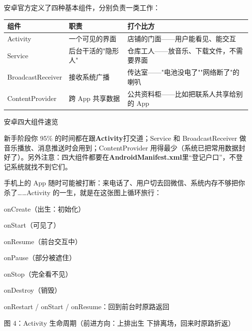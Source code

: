 


安卓官方定义了四种基本组件，分别负责一类工作：

\begin{center}
\begin{tabularx}{\linewidth}{|X|X|X|}
\hline
\textbf{组件} & \textbf{职责} & \textbf{打个比方} \tabularnewline
\hline
Activity & 一个可见的界面 & 店铺的门面——用户能看见、能交互 \tabularnewline
Service & 后台干活的"隐形人" & 仓库工人——放音乐、下载文件，不需要界面 \tabularnewline
BroadcastReceiver & 接收系统广播 & 传达室——"电池没电了""网络断了"的喇叭 \tabularnewline
ContentProvider & 跨 App 共享数据 & 公共资料柜——比如把联系人共享给别的 App \tabularnewline
\hline
\end{tabularx}
\end{center}

\begin{center}\small\color{gray}安卓四大组件速览\end{center}

新手阶段你 95\% 的时间都在跟\textbf{Activity}打交道；Service 和 BroadcastReceiver 做音乐播放、消息推送时会用到；ContentProvider 用得最少（系统已把常用数据封好了）。另外注意：四大组件都要在\textbf{AndroidManifest.xml}里“登记户口”，不登记系统就找不到它们。


手机上的 App 随时可能被打断：来电话了、用户切去回微信、系统内存不够把你杀了……Activity 的一生，就是在这张图上循环旅行：

onCreate（出生：初始化）

onStart（可见了）

onResume（前台交互中）

onPause（部分被遮住）

onStop（完全看不见）

onDestroy（销毁）

onRestart / onStart / onResume：回到前台时原路返回

\begin{center}\small\color{gray}图 4：Activity 生命周期（前进方向：上排出生 下排离场，回来时原路折返）\end{center}

